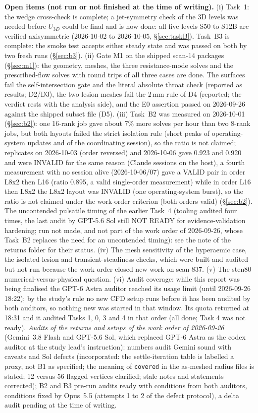 \documentclass[11pt]{article}
\begin{document}
\textbf{Open items (not run or not finished at the time of writing).} (i) Task~1: the wedge cross-check is complete; a jet-symmetry check of the 3D levels was needed before $U_{3D}$ could be final and is now done: all five levels S50 to S12B are verified axisymmetric (2026-10-02 to 2026-10-05, \S\ref{sec:taskB}). Task~B3 is complete: the smoke test accepts either steady state and was passed on both by two fresh runs (\S\ref{sec:b3}). (ii) Gate M1 on the shipped scan-14 packages (\S\ref{sec:m1}): the geometry, meshes, the three resistance-mode solves and the prescribed-flow solves with round trips of all three cases are done. The surfaces fail the self-intersection gate and the literal absolute throat check (reported as results; D2/D3), the two lesion meshes fail the 2\,mm rule of D4 (reported; the verdict rests with the analysis side), and the E0 assertion passed on 2026-09-26 against the shipped subset file (D5). (iii) Task~B2 was measured on 2026-10-01 (\S\ref{sec:b2}): one 16-rank job gave about 7\% more solves per hour than two 8-rank jobs, but both layouts failed the strict isolation rule (short peaks of operating-system updates and of the coordinating session), so the ratio is not claimed; replicates on 2026-10-03 (order reversed) and 2026-10-06 gave 0.923 and 0.920 and were INVALID for the same reason (Claude sessions on the host), a fourth measurement with no session alive (2026-10-06/07) gave a VALID pair in order L8x2 then L16 (ratio 0.895, a valid single-order measurement) while in order L16 then L8x2 the L8x2 layout was INVALID (one operating-system burst), so the ratio is not claimed under the work-order criterion (both orders valid) (\S\ref{sec:b2}). The uncontended pulsatile timing of the earlier Task~4 (tooling audited four times, the last audit by GPT-5.6 Sol still NOT READY for evidence-validation hardening; run not made, and not part of the work order of 2026-09-26, whose Task~B2 replaces the need for an uncontended timing): see the note of the returns folder for their status. (iv) The mesh sensitivity of the hyperaemic case, the isolated-lesion and transient-steadiness checks, which were built and audited but not run because the work order closed new work on scan 837. (v) The sten80 numerical-versus-physical question. (vi) Audit coverage: while this report was being finalised the GPT-6 Astra auditor reached its usage limit (until 2026-09-26 18:22); by the study's rule no new CFD setup runs before it has been audited by both auditors, so nothing new was started in that window. Its quota returned at 18:31 and it audited Tasks 1, 0, 3 and 4 in that order (all done; Task 4 was not ready). \emph{Audits of the returns and setups of the work order of 2026-09-26} (Gemini~3.8 Flash and GPT-5.6 Sol, which replaced GPT-6 Astra as the codex auditor at the study lead's instruction): numbers audit Gemini sound with caveats and Sol defects (incorporated: the settle-iteration table is labelled a proxy, not B1 as specified; the meaning of \texttt{covered} in the as-meshed radius files is stated; 12 versus 56 flagged vertices clarified; stale notes and statements corrected); B2 and B3 pre-run audits ready with conditions from both auditors, conditions fixed by Opus~5.5 (attempts 1 to 2 of the defect protocol), a delta audit pending at the time of writing.
\end{document}
